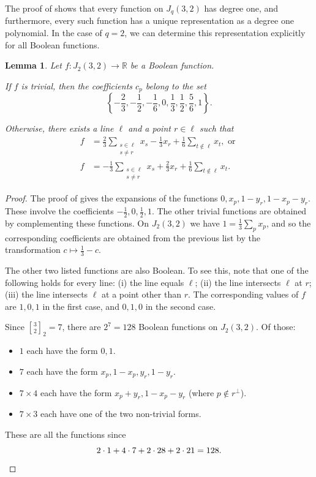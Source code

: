 \documentclass{article}
\newtheorem{lemma}[theorem]{Lemma}
\theoremstyle{definition}
\providecommand{\sqbinom}[2]{\genfrac{[}{]}{0pt}{}{#1}{#2}}
\providecommand{\RR}{\mathbb{R}}
\begin{document}
The proof of  shows that every function on $J_q(3,2)$ has degree one, and furthermore, every such function has a unique representation as a degree one polynomial. In the case of $q = 2$, we can determine this representation explicitly for all Boolean functions.

\begin{lemma} \label{lem:J232}
Let $f\colon J_2(3,2) \to \RR$ be a Boolean function.

If $f$ is trivial, then the coefficients $c_p$ belong to the set
\[
 \left\{
 -\frac{2}{3},-\frac{1}{2},-\frac{1}{6},0,\frac{1}{3},\frac{1}{2},\frac{5}{6},1
 \right\}.
\]

Otherwise, there exists a line $\ell$ and a point $r \in \ell$ such that
\begin{align*}
f &= \frac{2}{3} \sum_{\substack{s \in \ell \\ s \neq r}} x_s - \frac{1}{3} x_r + \frac{1}{6} \sum_{t \notin \ell} x_t, \text{ or } \\
f &= -\frac{1}{3} \sum_{\substack{s \in \ell \\ s \neq r}} x_s + \frac{2}{3} x_r + \frac{1}{6} \sum_{t \notin \ell} x_t.
\end{align*}
\end{lemma}
\begin{proof}
The proof of  gives the expansions of the functions $0,x_p,1-y_r,1-x_p-y_r$. These involve the coefficients $-\frac{1}{2},0,\frac{1}{2},1$. The other trivial functions are obtained by complementing these functions. On $J_2(3,2)$ we have $1 = \frac{1}{3} \sum_p x_p$, and so the corresponding coefficients are obtained from the previous list by the transformation $c \mapsto \frac{1}{3} - c$.

The other two listed functions are also Boolean. To see this, note that one of the following holds for every line: (i) the line equals $\ell$; (ii) the line intersects $\ell$ at $r$; (iii) the line intersects $\ell$ at a point other than $r$. The corresponding values of $f$ are $1,0,1$ in the first case, and $0,1,0$ in the second case.

Since $\sqbinom{3}{2}_2 = 7$, there are $2^7 = 128$ Boolean functions on $J_2(3,2)$. Of those:
\begin{itemize}
\item $1$ each have the form $0, 1$.
\item $7$ each have the form $x_p,1-x_p,y_r,1-y_r$.
\item $7 \times 4$ each have the form $x_p+y_r,1-x_p-y_r$ (where $p \notin r^\perp$).
\item $7 \times 3$ each have one of the two non-trivial forms.
\end{itemize}
These are all the functions since
\[
 2 \cdot 1 + 4 \cdot 7 + 2 \cdot 28 + 2 \cdot 21 = 128. \qedhere
\]
\end{proof}
\end{document}
